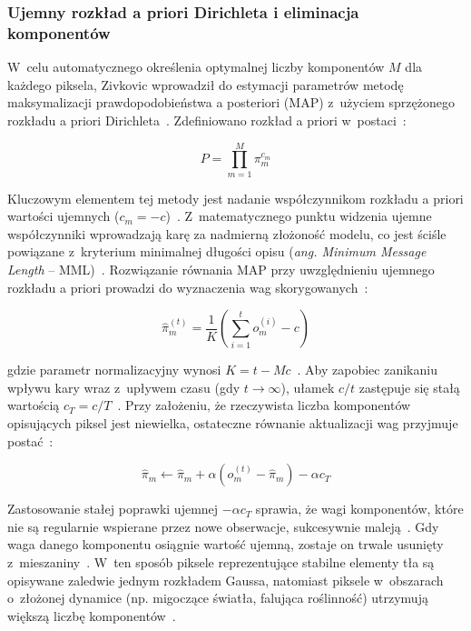 \subsubsection{Ujemny rozkład a priori Dirichleta i eliminacja komponentów}

W~celu automatycznego określenia optymalnej liczby komponentów $M$ dla każdego piksela, Zivkovic
wprowadził do estymacji parametrów metodę maksymalizacji prawdopodobieństwa a posteriori (MAP)
z~użyciem sprzężonego rozkładu a priori Dirichleta~\cite{zivkovic2004, zivkovic2006}. Zdefiniowano
rozkład a priori w~postaci~\cite{zivkovic2004}:

\begin{equation}
  P = \prod_{m=1}^M \pi_m^{c_m}
  \label{eq:dirichlet_prior}
\end{equation}

Kluczowym elementem tej metody jest nadanie współczynnikom rozkładu a priori wartości ujemnych
($c_m = -c$)~\cite{zivkovic2004}. Z~matematycznego punktu widzenia ujemne współczynniki wprowadzają
karę za nadmierną złożoność modelu, co jest ściśle powiązane z~kryterium minimalnej długości opisu
(\textit{ang. Minimum Message Length} -- MML)~\cite{zivkovic2004}. Rozwiązanie równania MAP przy
uwzględnieniu ujemnego rozkładu a priori prowadzi do wyznaczenia wag
skorygowanych~\cite{zivkovic2004}:

\begin{equation}
  \hat{\pi}_m^{(t)} = \frac{1}{K} \left( \sum_{i=1}^t o_m^{(i)} - c \right)
  \label{eq:map_weights}
\end{equation}

gdzie parametr normalizacyjny wynosi $K = t - Mc$~\cite{zivkovic2004}. Aby zapobiec zanikaniu
wpływu kary wraz z~upływem czasu (gdy $t \to \infty$), ułamek $c/t$ zastępuje się stałą wartością
$c_T = c/T$~\cite{zivkovic2004}. Przy założeniu, że rzeczywista liczba komponentów opisujących
piksel jest niewielka, ostateczne równanie aktualizacji wag przyjmuje postać~\cite{zivkovic2004}:

\begin{equation}
  \hat{\pi}_m \leftarrow \hat{\pi}_m + \alpha (o_m^{(t)} - \hat{\pi}_m) - \alpha c_T
  \label{eq:mog2_final_weight_update}
\end{equation}

Zastosowanie stałej poprawki ujemnej $-\alpha c_T$ sprawia, że wagi komponentów, które nie są
regularnie wspierane przez nowe obserwacje, sukcesywnie maleją~\cite{zivkovic2004}. Gdy waga danego
komponentu osiągnie wartość ujemną, zostaje on trwale usunięty z~mieszaniny~\cite{zivkovic2004}.
W~ten sposób piksele reprezentujące stabilne elementy tła są opisywane zaledwie jednym rozkładem
Gaussa, natomiast piksele w~obszarach o~złożonej dynamice (np. migoczące światła, falująca
roślinność) utrzymują większą liczbę komponentów~\cite{zivkovic2004, zivkovic2006}.

